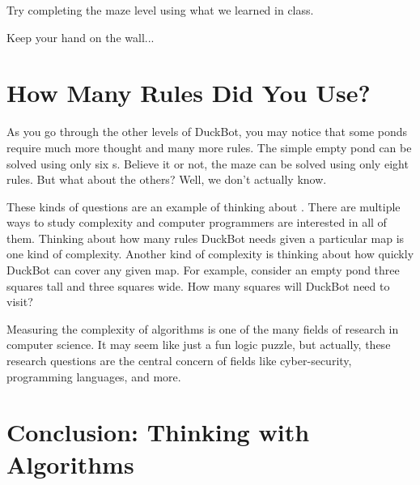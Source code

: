 \begin{TryThisBox}
  Try completing the maze level using what we learned in class.

  \hintnote Keep your hand on the wall...
\end{TryThisBox}

\section{How Many Rules Did You Use?}

As you go through the other levels of DuckBot, you may notice that some ponds require much more
thought and many more rules. The simple empty pond can be solved using only six s. Believe it
or not, the maze can be solved using only eight rules. But what about the others? Well, we don't
actually know.

  These kinds of questions are an example of
thinking about . There are multiple ways to study complexity and computer
programmers are interested in all of them. Thinking about how many rules DuckBot needs given a
particular map is one kind of complexity. Another kind of complexity is thinking about how quickly
DuckBot can cover any given map.  For example, consider an empty pond three squares tall and three
squares wide.  How many squares will DuckBot need to visit?

Measuring the complexity of algorithms is one of the many fields of research in computer science. It
may seem like just a fun logic puzzle, but actually, these research questions are the central
concern of fields like cyber-security, programming languages, and more.

\section{Conclusion: Thinking with Algorithms}

